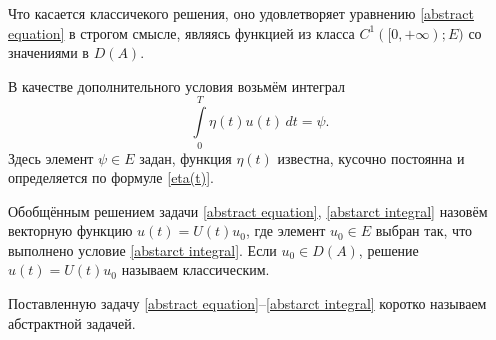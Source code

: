 \documentclass{article}
\theoremstyle{definition}
\begin{document}
Что касается классичекого решения, оно удовлетворяет уравнению \eqref{abstract equation} в строгом смысле,
являясь функцией из класса $C^1([0, +\infty); E)$ со значениями в $D(A)$.

В качестве дополнительного условия возьмём интеграл
\begin{equation} \label{abstarct integral}
	\int\limits_{0}^{T} \eta(t)u(t)\,dt = \psi.
\end{equation}
Здесь элемент $ \psi \in E $ задан, функция $ \eta(t) $ известна, кусочно постоянна и определяется по формуле \eqref{eta(t)}.

Обобщённым решением задачи \eqref{abstract equation}, \eqref{abstarct integral} назовём векторную функцию \linebreak $ u(t) = U(t)u_0 $, 
где элемент $ u_0 \in E $ выбран так, что выполнено условие \eqref{abstarct integral}. Если $ u_0 \in D(A) $, решение 
$ u(t) = U(t)u_0 $ называем классическим.

Поставленную задачу \eqref{abstract equation}--\eqref{abstarct integral} коротко называем абстрактной задачей.
\end{document}
